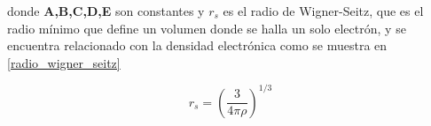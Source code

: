 \noindent donde \textbf{A,B,C,D,E} son constantes y $r_{s}$ es el radio de 
Wigner-Seitz, 
que es el radio m\'inimo que define un volumen donde se halla un solo 
electr\'on, y se encuentra relacionado con la densidad electr\'onica como se 
muestra en \ref{radio_wigner_seitz}

\begin{equation} \label{radio_wigner_seitz}
    r_{s} = \left( \frac{3}{4 \pi \rho } \right) ^{1/3}
\end{equation}
